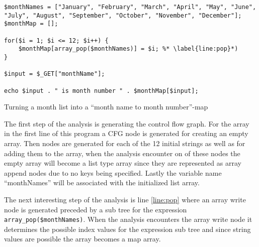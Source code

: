 \begin{program}
\begin{lstlisting}
$monthNames = ["January", "February", "March", "April", "May", "June", "July", "August", "September", "October", "November", "December"];
$monthMap = [];

for($i = 1; $i <= 12; $i++) {
	$monthMap[array_pop($monthNames)] = $i; %* \label{line:pop}*)
}

$input = $_GET["monthName"];

echo $input . " is month number " . $monthMap[$input];
\end{lstlisting}
\caption{Turning a month list into a ``month name to month number''-map}
\label{lst:monthsNoError}
\end{program}

The first step of the analysis is generating the control flow graph. For the array in the first line of this program a CFG node is generated for creating an empty array. Then nodes are generated for each of the 12 initial strings as well as for adding them to the array, when the analysis encounter on of these nodes the empty array will become a list type array since they are represented as array append nodes due to no keys being specified. Lastly the variable name ``monthNames'' will be associated with the initialized list array.

The next interesting step of the analysis is line \ref{line:pop} where an array write node is generated preceded by a sub tree for the expression \texttt{array\_pop(\$monthNames)}. When the analysis encounters the array write node it determines the possible index values for the expression sub tree and since string values are possible the array becomes a map array.

